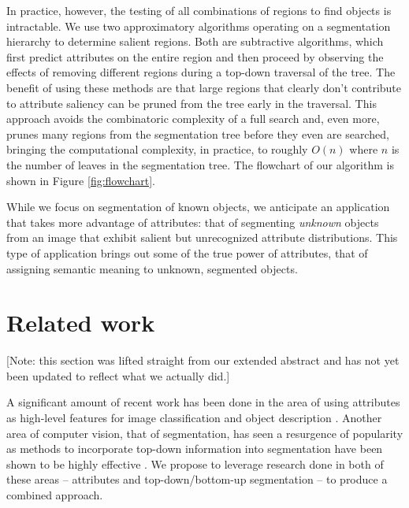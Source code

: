 \documentclass[10pt,twocolumn,letterpaper]{article}
\begin{document}
In practice, however, the testing of all combinations of regions to
find objects is intractable.  We use two approximatory algorithms
operating on a segmentation hierarchy to determine salient regions.
Both are subtractive algorithms, which first predict attributes on
the entire region and then proceed by observing the effects of
removing different regions during a top-down traversal of the tree.
The benefit of using these methods are that large regions that
clearly don't contribute to attribute saliency can be pruned from
the tree early in the traversal.  This approach avoids the
combinatoric complexity of a full search and, even more, prunes many
regions from the segmentation tree before they even are searched,
bringing the computational complexity, in practice, to roughly
$O(n)$ where $n$ is the number of leaves in the segmentation tree.
The flowchart of our algorithm is shown in Figure
\ref{fig:flowchart}.

While we focus on segmentation of known objects, we anticipate an application
that takes more advantage of attributes: that of segmenting \emph{unknown}
objects from an image that exhibit salient but unrecognized attribute
distributions.  This type of application brings out some of the true power of
attributes, that of assigning semantic meaning to unknown, segmented objects.


\section{Related work}
\label{sec:related_work}
[Note: this section was lifted straight from our extended abstract
and has not yet been updated to reflect what we actually did.]

A significant amount of recent work has been done in the area of using
attributes as high-level features for image classification and object
description \cite{farhadi09, lampert09, kumar09}.
Another area of computer vision, that of segmentation,
has seen a resurgence of popularity as methods to incorporate top-down
information into segmentation have been shown to be highly effective
\cite{borenstein04, pantofaru, gu09, russell06, malisiewicz, leibe04, hoiem05, shotton06}.
We propose to leverage research done in both of these areas -- attributes
and top-down/bottom-up segmentation -- to produce a combined approach.
\end{document}
